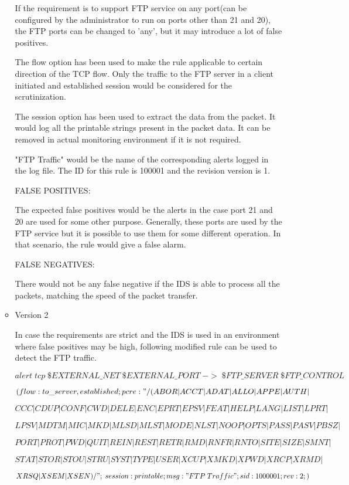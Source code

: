 \documentclass[11pt, pdftex]{article}
\begin{document}
\begin{enumerate}
\begin{itemize}
If the requirement is to support FTP service on any port(can be configured by the administrator to run on ports other than 21 and 20), the FTP ports can be changed to 'any', but it may introduce a lot of false positives.

The flow option has been used to make the rule applicable to certain direction of the TCP flow. Only the traffic to the FTP server in a client initiated and established session would be considered for the scrutinization. 

The session option has been used to extract the data from the packet. It would log all the printable strings present in the packet data. It can be removed in actual monitoring environment if it is not required. 

"FTP Traffic" would be the name of the corresponding alerts logged in the log file. The ID for this rule is 100001 and the revision version is 1.


FALSE POSITIVES:

The expected false positives would be the alerts in the case port 21 and 20 are used for some other purpose. Generally, these ports are used by the FTP service but it is possible to use them for some different operation. In that scenario, the rule would give a false alarm. 


FALSE NEGATIVES:

There would not be any false negative if the IDS is able to process all the packets, matching the speed of the packet transfer. 

	\item Version 2
	
In case the requirements are strict and the IDS is used in an environment where false positives may be high, following modified rule can be used to detect the FTP traffic.

$alert\; tcp\; \$EXTERNAL\_NET\; \$EXTERNAL\_PORT\; ->\; \$FTP\_SERVER\; \$FTP\_CONTROL\;$

$(flow:to\_server,established;pcre:"/(ABOR|ACCT|ADAT|ALLO|APPE|AUTH|$

$CCC|CDUP|CONF|CWD|DELE|ENC|EPRT|EPSV|FEAT|HELP|LANG|LIST|LPRT|$

$LPSV|MDTM|MIC|MKD|MLSD|MLST|MODE|NLST|NOOP|OPTS|PASS|PASV|PBSZ|$

$PORT|PROT|PWD|QUIT|REIN|REST|RETR|RMD|RNFR|RNTO|SITE|SIZE|SMNT|$

$STAT|STOR|STOU|STRU|SYST|TYPE|USER|XCUP|XMKD|XPWD|XRCP|XRMD|$

$XRSQ|XSEM|XSEN)/";\;session:printable;msg:"FTP\; Traffic";sid:1000001;rev:2;)$
	

\end{itemize}
\end{enumerate}
\end{document}
